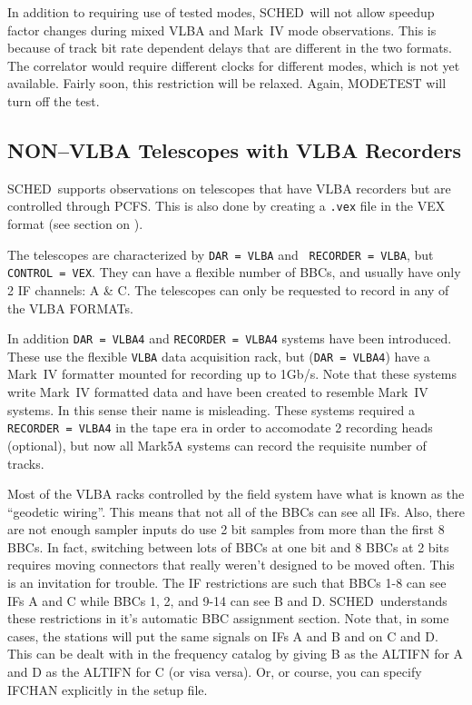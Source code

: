 \documentclass{report}
\newcommand{\schedb}{{\sc SCHED~}}
\begin{document}


In addition to requiring use of tested modes, \schedb will not
allow speedup factor changes during mixed VLBA and Mark~IV mode
observations.  This is because of track bit rate dependent delays that
are different in the two formats.  The correlator would require
different clocks for different modes, which is not yet available.
Fairly soon, this restriction will be relaxed.  Again, MODETEST will
turn off the test.

\subsection{\label{SSEC:FS9VLBA}NON--VLBA Telescopes with VLBA Recorders}

\schedb supports observations on telescopes that have VLBA
recorders but are controlled through PCFS. This is also done by
creating a {\tt *.vex} file in the VEX format (see section on
).

The telescopes are characterized by {\tt DAR = VLBA} and {\tt
RECORDER = VLBA}, but {\tt CONTROL = VEX}. They can have a flexible
number of BBCs, and usually have only 2 IF channels: A \& C.
The telescopes can only be requested to record in any of the
VLBA FORMATs.

In addition {\tt DAR = VLBA4} and {\tt RECORDER = VLBA4} systems have
been introduced. These use the flexible {\tt VLBA} data acquisition
rack, but ({\tt DAR = VLBA4}) have a Mark~IV formatter mounted for
recording up to 1Gb/s.  Note that these systems write Mark~IV
formatted data and have been created to resemble Mark~IV systems. In
this sense their name is misleading.  These systems required a {\tt
RECORDER = VLBA4} in the tape era in order to accomodate 2 recording
heads (optional), but now all Mark5A systems can record the requisite
number of tracks.

Most of the VLBA racks controlled by the field system have what is
known as the ``geodetic wiring''.  This means that not all of the
BBCs can see all IFs.  Also, there are not enough sampler inputs do
use 2 bit samples from more than the first 8 BBCs.  In fact, switching
between lots of BBCs at one bit and 8 BBCs at 2 bits requires moving
connectors that really weren't designed to be moved often.  This is
an invitation for trouble.  The IF restrictions are such that
BBCs 1-8 can see IFs A and C while BBCs 1, 2, and 9-14 can see B and D.
\schedb understands these restrictions in it's automatic BBC assignment
section.  Note that, in some cases, the stations will put the same
signals on IFs A and B and on C and D.  This can be dealt with in the
frequency catalog by giving B as the ALTIFN for A and D as the ALTIFN
for C (or visa versa).  Or, or course, you can specify IFCHAN explicitly
in the setup file.
\end{document}
